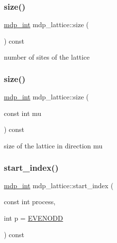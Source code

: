 \mbox{\label{classmdp__lattice_a587b4d64f806f7acf5787cb6a11b7568}} 
\subsubsection{\texorpdfstring{size()}{size()}\hspace{0.1cm}{\footnotesize\ttfamily [1/2]}}
{\footnotesize\ttfamily \hyperlink{mdp__global__vars_8h_aaa1ad9d0dcd2124aa5af0120d9954174}{mdp\+\_\+int} mdp\+\_\+lattice\+::size (\begin{DoxyParamCaption}{ }\end{DoxyParamCaption}) const\hspace{0.3cm}{\ttfamily [inline]}}



number of sites of the lattice 

\mbox{\label{classmdp__lattice_a94123e8ac3bdc0b40578c28fd3d64e39}} 
\subsubsection{\texorpdfstring{size()}{size()}\hspace{0.1cm}{\footnotesize\ttfamily [2/2]}}
{\footnotesize\ttfamily \hyperlink{mdp__global__vars_8h_aaa1ad9d0dcd2124aa5af0120d9954174}{mdp\+\_\+int} mdp\+\_\+lattice\+::size (\begin{DoxyParamCaption}\item[{const int}]{mu }\end{DoxyParamCaption}) const\hspace{0.3cm}{\ttfamily [inline]}}



size of the lattice in direction mu 

\mbox{\label{classmdp__lattice_a30b31dd7d1aec73bd90c24c81612e030}} 
\subsubsection{\texorpdfstring{start\+\_\+index()}{start\_index()}}
{\footnotesize\ttfamily \hyperlink{mdp__global__vars_8h_aaa1ad9d0dcd2124aa5af0120d9954174}{mdp\+\_\+int} mdp\+\_\+lattice\+::start\+\_\+index (\begin{DoxyParamCaption}\item[{const int}]{process,  }\item[{int}]{p = {\ttfamily \hyperlink{mdp__global__vars_8h_a4c9de81f2de5a74b588107b6c0afb9ee}{E\+V\+E\+N\+O\+DD}} }\end{DoxyParamCaption}) const\hspace{0.3cm}{\ttfamily [inline]}}

